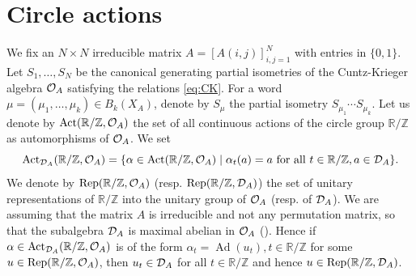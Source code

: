 \documentclass[11pt]{article}
\theoremstyle{plain}
\theoremstyle{definition}
\numberwithin{equation}{section}
\newcommand{\Ad}{\operatorname{Ad}}
\newcommand{\RZ}{\mathbb{R}/{\mathbb{Z}}}
\begin{document}
\section{Circle actions}
We fix  
an $N\times N$ irreducible matrix
$A=[A(i,j)]_{i,j=1}^N$ with entries in $\{0,1\}$.
Let $S_1,\dots, S_N$
be the canonical generating partial isometries of the Cuntz-Krieger 
algebra ${{\mathcal{O}}_A}$ satisfying the relations \eqref{eq:CK}.
For a word $\mu =(\mu_1, \dots, \mu_k) \in B_k(X_A)$,
denote by $S_\mu$ the partial isometry
$S_{\mu_1}\cdots S_{\mu_k}$.  
Let us denote by
${\operatorname{Act}}(\RZ,\OA)$
the set of all continuous actions of  the circle group
${\mathbb{R}}/{\mathbb{Z}} $ as automorphisms of ${{\mathcal{O}}_A}$.
We set
\begin{equation}
\operatorname{Act}_{\DA}(\RZ,\OA)
=\{ \alpha \in \operatorname{Act}(\RZ,\OA) \mid
\alpha_t(a) = a \text{ for all } t \in \RZ, a \in \DA\}.
\end{equation}
We denote by 
$\operatorname{Rep}(\RZ,\OA)$
(resp.
$\operatorname{Rep}(\RZ,\DA)$)
the set of unitary representations of $\RZ$ into 
the unitary group of ${{\mathcal{O}}_A}$ (resp. of ${{\mathcal{D}}_A}$).
We are assuming that the matrix $A$ 
is irreducible and not any permutation matrix,
so that the subalgebra ${{\mathcal{D}}_A}$ is maximal abelian in ${{\mathcal{O}}_A}$ (\cite{CK}).
Hence if $\alpha \in {{\operatorname{Act}_{{{\mathcal{D}}_A}}(\mathbb{R}/{\mathbb{Z}},{{\mathcal{O}}_A})}}$ is of the form 
$\alpha_t = \Ad(u_t), t \in \RZ$
for some  
$u \in \operatorname{Rep}(\RZ,\OA)$,
then
$u_t \in {{\mathcal{D}}_A}$ for all $t \in \RZ$
and hence 
$u \in \operatorname{Rep}(\RZ,\DA)$.
\end{document}
